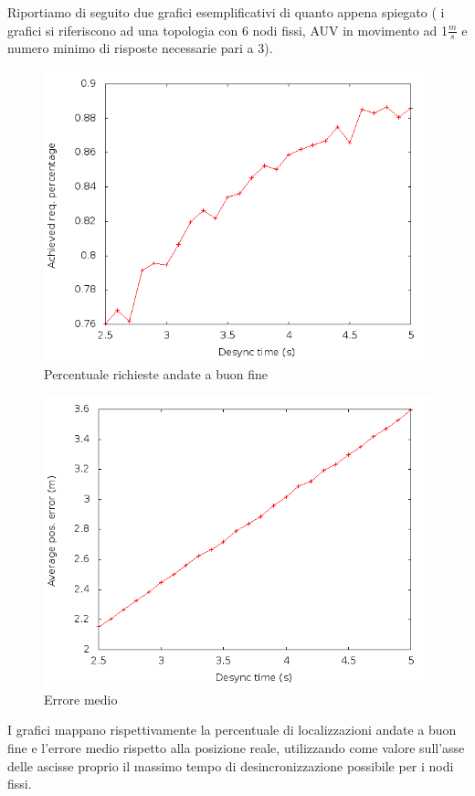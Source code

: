 \documentclass[Lau,binding=0.6cm]{sapthesis}
\begin{document}
Riportiamo di seguito due grafici esemplificativi di quanto appena spiegato ( i grafici si riferiscono ad una topologia con 6 nodi fissi, AUV in movimento ad 1$\frac{m}{s}$ e numero minimo di risposte necessarie pari a 3).
\begin{figure}[H]
    \centering
    \includegraphics[scale=0.5]{achievedlochexagon6nodescutoff4req3preempt0droponepoint0speed1.png}
    \caption{Percentuale richieste andate a buon fine}
    \label{fig:my_label}
\end{figure}
\begin{figure}[H]
    \centering
    \includegraphics[scale=0.5]{avposerrorhexagon6nodescutoff4req3preempt0droponepoint0speed1.png}
    \caption{Errore medio}
    \label{fig:avposerrorhexagon6nodescutoff4req3preempt0droponepoint0speed1}
\end{figure}
I grafici mappano rispettivamente la percentuale di localizzazioni andate a buon fine e l'errore medio rispetto alla posizione reale, utilizzando come valore sull'asse delle ascisse proprio il massimo tempo di desincronizzazione possibile per i nodi fissi.\newline
\end{document}
